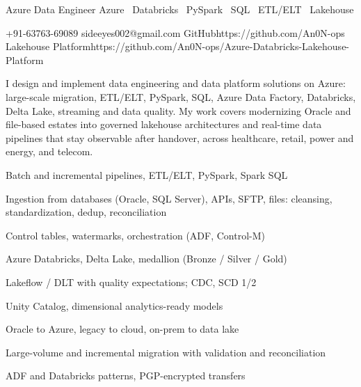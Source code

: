 \documentclass[10pt,a4paper]{article}
\begin{document}
          {Azure Data Engineer}
          {Azure \textperiodcentered\ Databricks \textperiodcentered\ PySpark
           \textperiodcentered\ SQL \textperiodcentered\ ETL/ELT
           \textperiodcentered\ Lakehouse}

        {+91-63763-69089}
        {sideeyes002@gmail.com}
        {GitHub}{https://github.com/An0N-ops}
        {Lakehouse Platform}{https://github.com/An0N-ops/Azure-Databricks-Lakehouse-Platform}


I design and implement data engineering and data platform solutions on
Azure: large-scale migration, ETL/ELT, PySpark, SQL, Azure Data Factory,
Databricks, Delta Lake, streaming and data quality. My work covers
modernizing Oracle and file-based estates into governed lakehouse
architectures and real-time data pipelines that stay observable after
handover, across healthcare, retail, power and energy, and telecom.


  {\item Batch and incremental pipelines, ETL/ELT, PySpark, Spark SQL
   \item Ingestion from databases (Oracle, SQL Server), APIs, SFTP, files:
         cleansing, standardization, dedup, reconciliation
   \item Control tables, watermarks, orchestration (ADF, Control-M)}

  {\item Azure Databricks, Delta Lake, medallion (Bronze / Silver / Gold)
   \item Lakeflow / DLT with quality expectations; CDC, SCD 1/2
   \item Unity Catalog, dimensional analytics-ready models}

  {\item Oracle to Azure, legacy to cloud, on-prem to data lake
   \item Large-volume and incremental migration with validation and
         reconciliation
   \item ADF and Databricks patterns, PGP-encrypted transfers}
\end{document}
